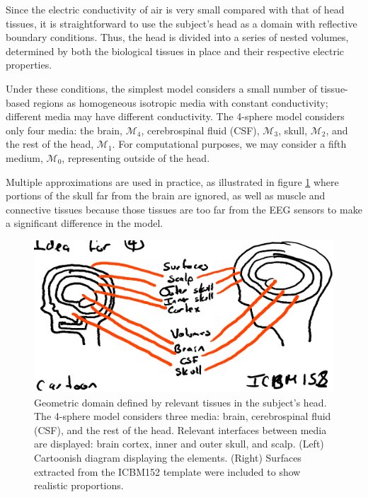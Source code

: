 Since the electric conductivity of air is very small compared with that of head tissues, it is straightforward to use the subject's head as a domain with reflective boundary conditions. 
%
Thus, the head is divided into a series of nested volumes, determined by both the biological tissues in place and their respective electric properties.

Under these conditions, the simplest model considers a small number of tissue-based regions as homogeneous isotropic media with constant conductivity; different media may have different conductivity.
%
The 4-sphere model considers only four media: the brain, $\mathcal{M}_4$, cerebrospinal fluid (CSF), $\mathcal{M}_3$, skull, $\mathcal{M}_2$, and the rest of the head, $\mathcal{M}_1$.
%
For computational purposes, we may consider a fifth medium, $\mathcal{M}_0$, representing outside of the head.

Multiple approximations are used in practice, as illustrated in figure \ref{fig:diagrams2} where portions of the skull far from the brain are ignored, as well as muscle and connective tissues 
because those tissues are too far from the EEG sensors to make a significant difference in the model.

\begin{figure}
\centering
\includegraphics[width=0.8\linewidth]{./img_dev/nsHeadSurfacesVolumes}
\caption{Geometric domain defined by relevant tissues in the subject's head. The 4-sphere model considers three media: brain, cerebrospinal fluid (CSF), and the rest of the head. Relevant interfaces between media are displayed: brain cortex, inner and outer skull, and scalp. (Left) Cartoonish diagram displaying the elements. (Right) Surfaces extracted from the ICBM152 template were included to show realistic proportions.}
\label{fig:diagrams2}
\end{figure}

